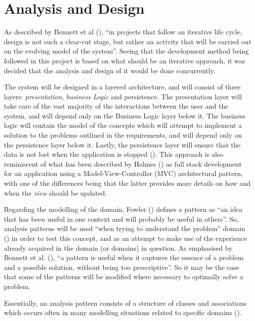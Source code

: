 \section{Analysis and Design} \label{sec:AnalysisAndDesign}

As described by Bennett et al (\citeyear[][p.~348]{bennett2010object}), ``in
projects that follow an iterative life cycle, design is not such a clear-cut
stage, but rather an activity that will be carried out on the evolving model of
the system''. Seeing that the development method being followed in this project
is based on what should be an iterative approach, it was decided that the
analysis and design of it would be done concurrently.

The system will be designed in a layered architecture, and will consist of
three layers: \emph{presentation}, \emph{business Logic} and {persistence}. The
presentation layer will take care of the vast majority of the interactions
between the user and the system, and will depend only on the Business Logic
layer below it. The business logic will contain the model of the concepts which
will attempt to implement a solution to the problems outlined in the
requirements, and will depend only on the persistence layer below it. Lastly,
the persistence layer will ensure that the data is not lost when the
application is stopped (\cite[][p.~32-33]{bauer2016hibernate}). This approach
is also reminiscent of what has been described by Holmes
(\citeyear[][p.~3]{holmes2016mean}) as full stack development for an
application using a Model-View-Controller (MVC) architectural pattern, with one
of the differences being that the latter provides more details on how and when
the \emph{view} should be updated.

Regarding the modelling of the domain, Fowler
(\citeyear[][Section~1.3]{fowler1997analysis}) defines a pattern as ``an idea
that has been useful in one context and will probably be useful in others''.
So, analysis patterns will be used ``when trying to understand the problem''
domain (\cite[][Section~1.1]{fowler1997analysis}) in order to test this
concept, and as an attempt to make use of the experience already acquired in
the domain (or domains) in question. As emphasised by Bennett et al.
(\citeyear[][p.~252]{bennett2010object}), ``a pattern is useful when it
captures the essence of a problem and a possible solution, without being too
prescriptive''. So it may be the case that some of the patterns will be
modified where necessary to optimally solve a problem.

Essentially, an analysis pattern consists of a structure of classes and
associations which occurs often in many modelling situations related to
specific domains (\cite[][p.~254]{bennett2010object}).


